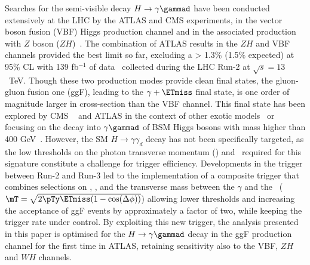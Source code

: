 Searches for the semi-visible decay $H\to\gamma\gammad$  have been conducted extensively at the LHC by the ATLAS and CMS experiments, in the vector boson fusion (VBF) Higgs production channel and in the associated production with $Z$ boson ($ZH$)~\cite{HDBS-2019-13, EXOT-2021-17, EXOT-2018-63, CMS-EXO-19-007,EXOT-2014-06,CMS-EXO-12-047,CMS-HIG-14-025,CMS-EXO-20-005}. The combination of ATLAS results in the $ZH$ and VBF channels provided the best limit so far, excluding a \br> 1.3\% (1.5\% expected) at 95\% CL with 139 fb\(^{-1}\) of data~\cite{ATLAS:2024cju} collected during the LHC Run-2 at $\sqrt{s}=13$\ TeV. 
Though these two production modes provide clean final states, the gluon-gluon fusion one (ggF), leading to the $\gamma+\ETmiss$ final state, is one order of magnitude larger in cross-section than the VBF channel. This final state has been explored by CMS ~\cite{CMS-HIG-14-025} and ATLAS in the context of other exotic models~\cite{EXOT-2018-63} or focusing on the decay into $\gamma\gammad$ of BSM Higgs bosons with mass higher than 400 GeV~\cite{ATL-PHYS-PUB-2023-003}. However, the SM $H \to \gamma \gamma_d$ decay has not been specifically targeted, as the low thresholds on the photon transverse momentum (\pTy) and \ETmiss\  required for this signature constitute a challenge for trigger efficiency. Developments in the trigger between Run-2 and Run-3 led to the implementation of a composite trigger that combines selections on \ETmiss, \pTy, and the transverse mass between the $\gamma$ and the \ETmiss\ ($\mT=\sqrt{2\pTy\ETmiss(1-\cos(\Delta\phi))}$) allowing lower thresholds and increasing the acceptance of ggF events by approximately a factor of two, while keeping the trigger rate under control. By exploiting this new trigger, the analysis presented in this paper is optimised for the $H\to\gamma\gammad$ decay in the ggF production channel for the first time in ATLAS, retaining sensitivity also to the VBF, $ZH$ and $WH$ channels. 

